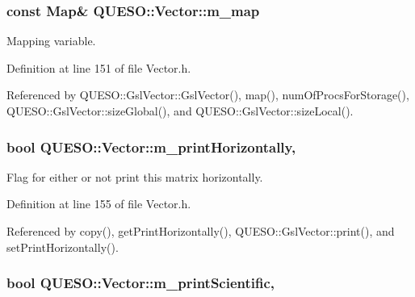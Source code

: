 \hypertarget{class_q_u_e_s_o_1_1_vector_aa99c771bc8d1aafff7277ed8f7fbd157}{
\subsubsection[{m\-\_\-map}]{\setlength{\rightskip}{0pt plus 5cm}const {\bf Map}\& Q\-U\-E\-S\-O\-::\-Vector\-::m\-\_\-map\hspace{0.3cm}{\ttfamily [protected]}}}\label{class_q_u_e_s_o_1_1_vector_aa99c771bc8d1aafff7277ed8f7fbd157}


Mapping variable. 



Definition at line 151 of file Vector.\-h.



Referenced by Q\-U\-E\-S\-O\-::\-Gsl\-Vector\-::\-Gsl\-Vector(), map(), num\-Of\-Procs\-For\-Storage(), Q\-U\-E\-S\-O\-::\-Gsl\-Vector\-::size\-Global(), and Q\-U\-E\-S\-O\-::\-Gsl\-Vector\-::size\-Local().

\hypertarget{class_q_u_e_s_o_1_1_vector_a6bc4326d0e4f44f015bf2e30c7ee620d}{
\subsubsection[{m\-\_\-print\-Horizontally}]{\setlength{\rightskip}{0pt plus 5cm}bool Q\-U\-E\-S\-O\-::\-Vector\-::m\-\_\-print\-Horizontally\hspace{0.3cm}{\ttfamily [mutable]}, {\ttfamily [protected]}}}\label{class_q_u_e_s_o_1_1_vector_a6bc4326d0e4f44f015bf2e30c7ee620d}


Flag for either or not print this matrix horizontally. 



Definition at line 155 of file Vector.\-h.



Referenced by copy(), get\-Print\-Horizontally(), Q\-U\-E\-S\-O\-::\-Gsl\-Vector\-::print(), and set\-Print\-Horizontally().

\hypertarget{class_q_u_e_s_o_1_1_vector_a55d8e946571a9491a028ecb9a8a992a4}{
\subsubsection[{m\-\_\-print\-Scientific}]{\setlength{\rightskip}{0pt plus 5cm}bool Q\-U\-E\-S\-O\-::\-Vector\-::m\-\_\-print\-Scientific\hspace{0.3cm}{\ttfamily [mutable]}, {\ttfamily [protected]}}}\label{class_q_u_e_s_o_1_1_vector_a55d8e946571a9491a028ecb9a8a992a4}


